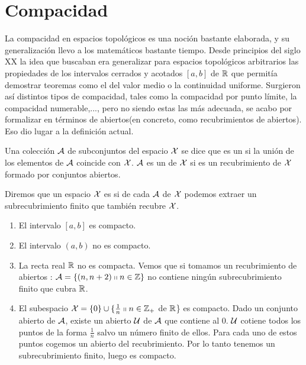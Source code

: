 \chapter{Compacidad}
\label{comp}
La compacidad en espacios topológicos es una noción bastante elaborada, y su generalización llevo a los matemáticos bastante tiempo. Desde principios del siglo XX la idea que buscaban era generalizar para espacios topológicos arbitrarios las propiedades de los intervalos cerrados y acotados $[a,b]$ de $\mathbb{R}$ que permitía demostrar teoremas como el del valor medio o la continuidad uniforme. Surgieron así distintos tipos de compacidad, tales como la compacidad por punto límite, la compacidad numerable,...,  pero no siendo estas las más adecuada, se acabo por formalizar en términos de abiertos(en concreto, como recubrimientos de abiertos). Eso dio lugar a la definición actual.
\begin{defi}
	Una colección $\mathcal{A}$ de subconjuntos del espacio $\mathcal{X}$ se dice que es un  si la unión de los elementos de $\mathcal{A}$ coincide con $\mathcal{X}$. $\mathcal{A}$ es un  de $\mathcal{X}$ si es un recubrimiento de $\mathcal{X}$ formado por conjuntos abiertos.
\end{defi}

\begin{defi}[Compacto]
	Diremos que un espacio $\mathcal{X}$ es  si de cada  $\mathcal{A}$ de $\mathcal{X}$ podemos extraer un subrecubrimiento finito que también recubre $\mathcal{X}$.
\end{defi}

\begin{exa}
	\begin{enumerate}
		\item El intervalo $[a,b]$ es compacto.
		\item El intervalo $(a,b)$ no es compacto.
		\item La recta real $\mathbb{R}$ no es compacta. Vemos que si tomamos un recubrimiento de abiertos : $\mathcal{A}=\{(n,n+2) \shortparallel n \in \mathbb{Z}\}$ no contiene ningún subrecubrimiento finito que cubra $\mathbb{R}$.
		\item El subespacio $\mathcal{X} = \{0\} \cup \{\frac{1}{n} \shortparallel n \in \mathbb{Z}_{+}$ de $\mathbb{R}$\} es compacto.
		Dado un conjunto abierto de $\mathcal{A}$, existe un abierto $\mathcal{U}$ de $\mathcal{A}$ que contiene al $0$. $\mathcal{U}$ cotiene todos los puntos de la forma $\frac{1}{n}$ salvo un número finito de ellos. Para cada uno de estos puntos cogemos un abierto del recubrimiento. Por lo tanto tenemos un subrecubrimiento finito, luego es compacto. 
	\end{enumerate}
\end{exa}

